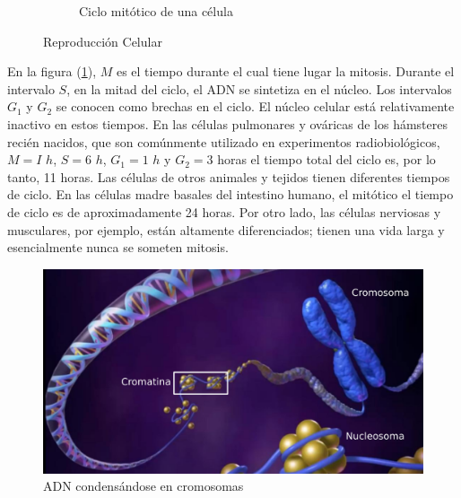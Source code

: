 \documentclass[]{article}
\begin{document}
\begin{figure}[h!]
\begin{subfigure}[b]{0.3\textwidth}
     \caption{Ciclo mitótico de una célula}
     \label{mititicCycle}
   \end{subfigure}
	\caption{Reproducción Celular}
	\label{repCelularGanz}
\end{figure}

En la figura (\ref{mititicCycle}), $M$ es el tiempo durante el cual tiene lugar la mitosis. Durante el intervalo $S$, en la mitad del ciclo, el ADN se sintetiza en el núcleo. Los intervalos $G_1$ y $G_2$ se conocen como brechas en el ciclo. El núcleo celular está relativamente inactivo en estos tiempos. En las células pulmonares y ováricas de los hámsteres recién nacidos, que son comúnmente utilizado en experimentos radiobiológicos, $M = I$ $h$, $S = 6$ $h$, $G_1 = 1$ $h$ y $G_2 = 3$ horas el tiempo total del ciclo es, por lo tanto, 11 horas. Las células de otros animales y tejidos tienen diferentes tiempos de ciclo. En las células madre basales del intestino humano, el mitótico el tiempo de ciclo es de aproximadamente 24 horas. Por otro lado, las células nerviosas y musculares, por ejemplo, están altamente diferenciados; tienen una vida larga y esencialmente nunca se someten mitosis.\\

\begin{figure}[h!]
	\includegraphics[width=\textwidth]{ADN.png}
	\caption{ADN condensándose en cromosomas}
\end{figure}
\end{document}
